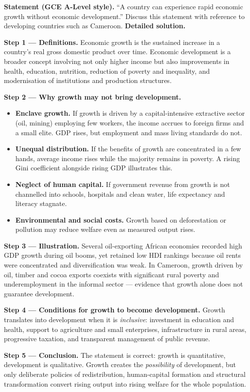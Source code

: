 \documentclass[11pt]{article}
\newcommand{\cle}[1]{{\popxbold\color{popdark}#1}}
\begin{document}
\begin{exoresolu}
\textbf{Statement (GCE A-Level style).} ``A country can experience rapid economic growth without economic development.'' Discuss this statement with reference to developing countries such as Cameroon.
\tcblower
\textbf{Detailed solution.}

\textbf{Step 1 — Definitions.} Economic growth is the sustained increase in a country's \cle{real gross domestic product} over time. Economic development is a broader concept involving not only higher income but also improvements in health, education, nutrition, reduction of poverty and inequality, and modernisation of institutions and production structures.

\textbf{Step 2 — Why growth may not bring development.}
\begin{itemize}
\item \textbf{Enclave growth.} If growth is driven by a capital-intensive extractive sector (oil, mining) employing few workers, the income accrues to foreign firms and a small elite. GDP rises, but employment and mass living standards do not.
\item \textbf{Unequal distribution.} If the benefits of growth are concentrated in a few hands, average income rises while the majority remains in poverty. A rising Gini coefficient alongside rising GDP illustrates this.
\item \textbf{Neglect of human capital.} If government revenue from growth is not channelled into schools, hospitals and clean water, life expectancy and literacy stagnate.
\item \textbf{Environmental and social costs.} Growth based on deforestation or pollution may reduce welfare even as measured output rises.
\end{itemize}

\textbf{Step 3 — Illustration.} Several oil-exporting African economies recorded high GDP growth during oil booms, yet retained low HDI rankings because oil rents were concentrated and diversification was weak. In Cameroon, growth driven by oil, timber and cocoa exports coexists with significant rural poverty and underemployment in the informal sector — evidence that growth alone does not guarantee development.

\textbf{Step 4 — Conditions for growth to become development.} Growth translates into development when it is \emph{inclusive}: investment in education and health, support to agriculture and small enterprises, infrastructure in rural areas, progressive taxation, and transparent management of public revenue.

\textbf{Step 5 — Conclusion.} The statement is correct: growth is quantitative, development is qualitative. Growth creates the \emph{possibility} of development, but only deliberate policies of redistribution, human-capital formation and structural transformation convert rising output into rising welfare for the whole population.
\end{exoresolu}
\end{document}
